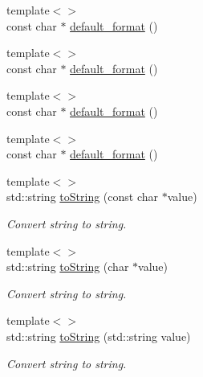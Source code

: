 \begin{DoxyCompactItemize}
\item 
{\footnotesize template$<$$>$ }\\const char $\ast$ \hyperlink{struct_d_d4hep_1_1_primitive_a153f4b4817a67be6de6ab05761558fda}{default\+\_\+format} ()
\item 
{\footnotesize template$<$$>$ }\\const char $\ast$ \hyperlink{struct_d_d4hep_1_1_primitive_a1d057ef3ff7d931da8b8fa913f7ba177}{default\+\_\+format} ()
\item 
{\footnotesize template$<$$>$ }\\const char $\ast$ \hyperlink{struct_d_d4hep_1_1_primitive_a36fcfad49a2a8ffaafad5c8daf0b4899}{default\+\_\+format} ()
\item 
{\footnotesize template$<$$>$ }\\const char $\ast$ \hyperlink{struct_d_d4hep_1_1_primitive_a9687d0223309623545e48ca3f7d72da3}{default\+\_\+format} ()
\item 
{\footnotesize template$<$$>$ }\\std\+::string \hyperlink{struct_d_d4hep_1_1_primitive_aa55fc14c1e3aa75cc5985312bf39ac22}{to\+String} (const char $\ast$value)
\begin{DoxyCompactList}\small\item\em Convert string to string. \end{DoxyCompactList}\item 
{\footnotesize template$<$$>$ }\\std\+::string \hyperlink{struct_d_d4hep_1_1_primitive_af5c270800451a5928940274b7a3142c9}{to\+String} (char $\ast$value)
\begin{DoxyCompactList}\small\item\em Convert string to string. \end{DoxyCompactList}\item 
{\footnotesize template$<$$>$ }\\std\+::string \hyperlink{struct_d_d4hep_1_1_primitive_ab13273b17c6e2cb1a330d23ad8a891db}{to\+String} (std\+::string value)
\begin{DoxyCompactList}\small\item\em Convert string to string. \end{DoxyCompactList}\end{DoxyCompactItemize}
